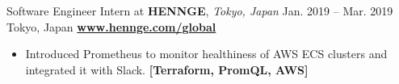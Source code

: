 \cveventflat
{Software Engineer Intern at }
{\textbf{HENNGE}, \textit{Tokyo, Japan}}
{Jan. 2019 -- Mar. 2019}
{Tokyo, Japan}
\newline
\href{https://hennge.com/global/}{\textbf{www.hennge.com/global}}
\begin{itemize}
    \item Introduced Prometheus to monitor healthiness of AWS ECS clusters and integrated it with Slack.
    \textbf{[Terraform, PromQL, AWS]}
\end{itemize}
